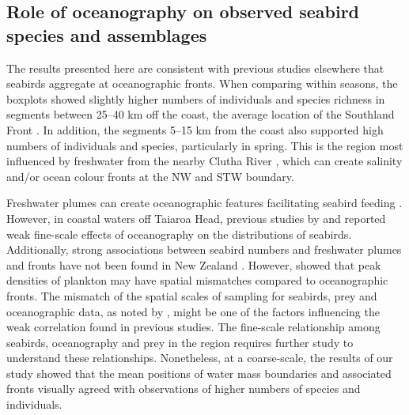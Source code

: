 \documentclass[preprint, 3p, authoryear]{elsarticle} %
\begin{document}
\hypertarget{role-of-oceanography-on-observed-seabird-species-and-assemblages}{%
\subsection{Role of oceanography on observed seabird species and assemblages}\label{role-of-oceanography-on-observed-seabird-species-and-assemblages}}

The results presented here are consistent with previous studies elsewhere that seabirds aggregate at oceanographic fronts. When comparing within seasons, the boxplots showed slightly higher numbers of individuals and species richness in segments between 25--40 km off the coast, the average location of the Southland Front \citep{hopkins2010, jones2013}. In addition, the segments 5--15 km from the coast also supported high numbers of individuals and species, particularly in spring. This is the region most influenced by freshwater from the nearby Clutha River \citep{johnson2024}, which can create salinity and/or ocean colour fronts at the NW and STW boundary.

Freshwater plumes can create oceanographic features facilitating seabird feeding \citep{zamon2003, phillips2018, daudt2019}. However, in coastal waters off Taiaroa Head, previous studies by \citet{mcclatchie1989} and \citet{odriscoll1998a} reported weak fine-scale effects of oceanography on the distributions of seabirds. Additionally, strong associations between seabird numbers and freshwater plumes and fronts have not been found in New Zealand \citep{mcclatchie1989, odriscoll1998a, hawke1996}. However, \citet{odriscoll1998} showed that peak densities of plankton may have spatial mismatches compared to oceanographic fronts. The mismatch of the spatial scales of sampling for seabirds, prey and oceanographic data, as noted by \citet{odriscoll1998a}, might be one of the factors influencing the weak correlation found in previous studies. The fine-scale relationship among seabirds, oceanography and prey in the region requires further study to understand these relationships. Nonetheless, at a coarse-scale, the results of our study showed that the mean positions of water mass boundaries and associated fronts visually agreed with observations of higher numbers of species and individuals.
\end{document}
